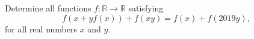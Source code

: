Determine all functions $f: \mathbb{R} \to \mathbb{R}$ satisfying
\[f(x + yf(x)) + f(xy) = f(x) + f(2019y),\]
for all real numbers $x$ and $y$.